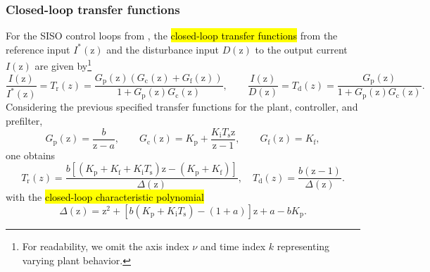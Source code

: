 \begin{frame}
    \frametitle{Closed-loop transfer functions}
    For the SISO control loops from , the \hl{closed-loop transfer functions} from the reference input $I^{*}(\mathrm{z})$ and the disturbance input $D(\mathrm{z})$ to the output current $I(\mathrm{z})$ are given by\footnote{For readability, we omit the axis index $\nu$ and time index $k$ representing varying plant behavior.}
    \begin{equation}
        \frac{I(\mathrm{z})}{I^{*}(\mathrm{z})}=T_\mathrm{r}(z)=\frac{G_{\mathrm{p}}(\mathrm{z})\left(G_{\mathrm{c}}(\mathrm{z})+G_{\mathrm{f}}(\mathrm{z})\right)}{1+G_{\mathrm{p}}(\mathrm{z})G_{\mathrm{c}}(\mathrm{z})},
        \qquad
        \frac{I(\mathrm{z})}{D(\mathrm{z})}=T_\mathrm{d}(z)=\frac{G_{\mathrm{p}}(\mathrm{z})}{1+G_{\mathrm{p}}(\mathrm{z})G_{\mathrm{c}}(\mathrm{z})}.
    \end{equation}\pause%
    Considering the previous specified transfer functions for the plant, controller, and prefilter,
    \begin{equation}
        G_{\mathrm{p}}(\mathrm{z})=\frac{b}{\mathrm{z}-a},
        \qquad
        G_{\mathrm{c}}(\mathrm{z})=K_\mathrm{p}+\frac{K_\mathrm{i}T_\mathrm{s}\mathrm{z}}{\mathrm{z}-1},
        \qquad
        G_{\mathrm{f}}(\mathrm{z})=K_\mathrm{f},
    \end{equation}\pause%
    one obtains
    \begin{equation}
        T_\mathrm{r}(z)=\frac{b\left[(K_\mathrm{p}+K_\mathrm{f}+K_\mathrm{i}T_\mathrm{s})\mathrm{z}-(K_\mathrm{p}+K_\mathrm{f})\right]}{\Delta(\mathrm{z})},
        \quad
        T_\mathrm{d}(z)=\frac{b(\mathrm{z}-1)}{\Delta(\mathrm{z})}.
        \label{eq:closed_loop_transfer_functions_current_control_FOC_SM}
    \end{equation}\pause%
    with the \hl{closed-loop characteristic polynomial}
    \begin{equation}
        \Delta(\mathrm{z})=\mathrm{z}^2+\left[b\left(K_\mathrm{p}+K_\mathrm{i}T_\mathrm{s}\right)-(1+a)\right]\mathrm{z}+a-bK_\mathrm{p}.
        \label{eq:closed_loop_den_addendum}
    \end{equation}
\end{frame}


